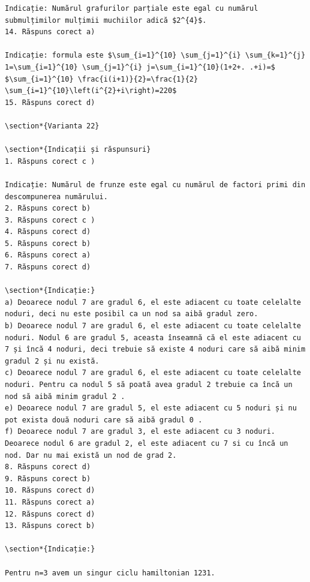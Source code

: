 \documentclass[10pt]{article}
\begin{document}
\begin{verbatim}
Indicație: Numărul grafurilor parțiale este egal cu numărul submulțimilor mulțimii muchiilor adică $2^{4}$.
14. Răspuns corect a)

Indicație: formula este $\sum_{i=1}^{10} \sum_{j=1}^{i} \sum_{k=1}^{j} 1=\sum_{i=1}^{10} \sum_{j=1}^{i} j=\sum_{i=1}^{10}(1+2+. .+i)=$ $\sum_{i=1}^{10} \frac{i(i+1)}{2}=\frac{1}{2} \sum_{i=1}^{10}\left(i^{2}+i\right)=220$
15. Răspuns corect d)

\section*{Varianta 22}

\section*{Indicații și răspunsuri}
1. Răspuns corect c )

Indicație: Numărul de frunze este egal cu numărul de factori primi din descompunerea numărului.
2. Răspuns corect b)
3. Răspuns corect c )
4. Răspuns corect d)
5. Răspuns corect b)
6. Răspuns corect a)
7. Răspuns corect d)

\section*{Indicație:}
a) Deoarece nodul 7 are gradul 6, el este adiacent cu toate celelalte noduri, deci nu este posibil ca un nod sa aibă gradul zero.
b) Deoarece nodul 7 are gradul 6, el este adiacent cu toate celelalte noduri. Nodul 6 are gradul 5, aceasta înseamnă că el este adiacent cu 7 și încă 4 noduri, deci trebuie să existe 4 noduri care să aibă minim gradul 2 și nu există.
c) Deoarece nodul 7 are gradul 6, el este adiacent cu toate celelalte noduri. Pentru ca nodul 5 să poată avea gradul 2 trebuie ca încă un nod să aibă minim gradul 2 .
e) Deoarece nodul 7 are gradul 5, el este adiacent cu 5 noduri și nu pot exista două noduri care să aibă gradul 0 .
f) Deoarece nodul 7 are gradul 3, el este adiacent cu 3 noduri. Deoarece nodul 6 are gradul 2, el este adiacent cu 7 si cu încă un nod. Dar nu mai există un nod de grad 2.
8. Răspuns corect d)
9. Răspuns corect b)
10. Răspuns corect d)
11. Răspuns corect a)
12. Răspuns corect d)
13. Răspuns corect b)

\section*{Indicație:}

Pentru n=3 avem un singur ciclu hamiltonian 1231.


\end{verbatim}
\end{document}
